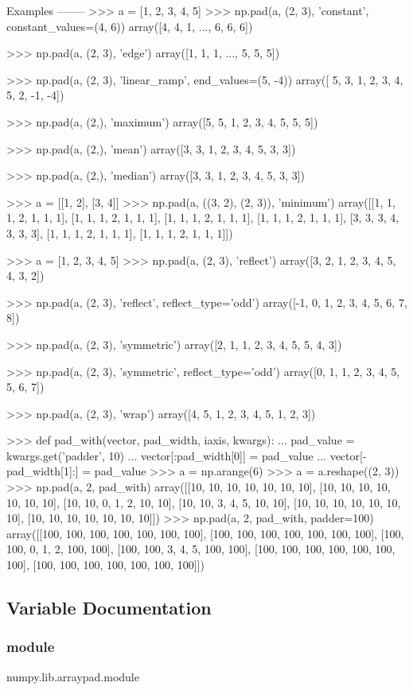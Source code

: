\begin{DoxyVerb}
Examples
--------
>>> a = [1, 2, 3, 4, 5]
>>> np.pad(a, (2, 3), 'constant', constant_values=(4, 6))
array([4, 4, 1, ..., 6, 6, 6])

>>> np.pad(a, (2, 3), 'edge')
array([1, 1, 1, ..., 5, 5, 5])

>>> np.pad(a, (2, 3), 'linear_ramp', end_values=(5, -4))
array([ 5,  3,  1,  2,  3,  4,  5,  2, -1, -4])

>>> np.pad(a, (2,), 'maximum')
array([5, 5, 1, 2, 3, 4, 5, 5, 5])

>>> np.pad(a, (2,), 'mean')
array([3, 3, 1, 2, 3, 4, 5, 3, 3])

>>> np.pad(a, (2,), 'median')
array([3, 3, 1, 2, 3, 4, 5, 3, 3])

>>> a = [[1, 2], [3, 4]]
>>> np.pad(a, ((3, 2), (2, 3)), 'minimum')
array([[1, 1, 1, 2, 1, 1, 1],
       [1, 1, 1, 2, 1, 1, 1],
       [1, 1, 1, 2, 1, 1, 1],
       [1, 1, 1, 2, 1, 1, 1],
       [3, 3, 3, 4, 3, 3, 3],
       [1, 1, 1, 2, 1, 1, 1],
       [1, 1, 1, 2, 1, 1, 1]])

>>> a = [1, 2, 3, 4, 5]
>>> np.pad(a, (2, 3), 'reflect')
array([3, 2, 1, 2, 3, 4, 5, 4, 3, 2])

>>> np.pad(a, (2, 3), 'reflect', reflect_type='odd')
array([-1,  0,  1,  2,  3,  4,  5,  6,  7,  8])

>>> np.pad(a, (2, 3), 'symmetric')
array([2, 1, 1, 2, 3, 4, 5, 5, 4, 3])

>>> np.pad(a, (2, 3), 'symmetric', reflect_type='odd')
array([0, 1, 1, 2, 3, 4, 5, 5, 6, 7])

>>> np.pad(a, (2, 3), 'wrap')
array([4, 5, 1, 2, 3, 4, 5, 1, 2, 3])

>>> def pad_with(vector, pad_width, iaxis, kwargs):
...     pad_value = kwargs.get('padder', 10)
...     vector[:pad_width[0]] = pad_value
...     vector[-pad_width[1]:] = pad_value
>>> a = np.arange(6)
>>> a = a.reshape((2, 3))
>>> np.pad(a, 2, pad_with)
array([[10, 10, 10, 10, 10, 10, 10],
       [10, 10, 10, 10, 10, 10, 10],
       [10, 10,  0,  1,  2, 10, 10],
       [10, 10,  3,  4,  5, 10, 10],
       [10, 10, 10, 10, 10, 10, 10],
       [10, 10, 10, 10, 10, 10, 10]])
>>> np.pad(a, 2, pad_with, padder=100)
array([[100, 100, 100, 100, 100, 100, 100],
       [100, 100, 100, 100, 100, 100, 100],
       [100, 100,   0,   1,   2, 100, 100],
       [100, 100,   3,   4,   5, 100, 100],
       [100, 100, 100, 100, 100, 100, 100],
       [100, 100, 100, 100, 100, 100, 100]])
\end{DoxyVerb}
 

\subsection{Variable Documentation}
\mbox{\label{namespacenumpy_1_1lib_1_1arraypad_ad8da0f592030d00ff3a1a6617431b387}} 
\subsubsection{\texorpdfstring{module}{module}}
{\footnotesize\ttfamily numpy.\+lib.\+arraypad.\+module}

